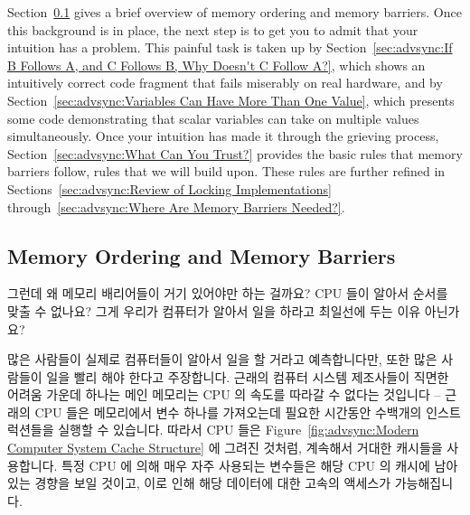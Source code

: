 Section~\ref{sec:advsync:Memory Ordering and Memory Barriers}
gives a brief overview of memory ordering and memory barriers.
Once this background is in place, the next step is to get you to admit
that your intuition has a problem.
This painful task is taken up by
Section~\ref{sec:advsync:If B Follows A, and C Follows B, Why Doesn't C Follow A?},
which shows an intuitively correct code fragment that fails miserably
on real hardware, and by
Section~\ref{sec:advsync:Variables Can Have More Than One Value},
which presents some code demonstrating that scalar variables can
take on multiple values simultaneously.
Once your intuition has made it through the grieving process,
Section~\ref{sec:advsync:What Can You Trust?}
provides the basic rules that memory barriers follow, rules that we
will build upon.
These rules are further refined in
Sections~\ref{sec:advsync:Review of Locking Implementations}
through~\ref{sec:advsync:Where Are Memory Barriers Needed?}.
\fi

\subsection{Memory Ordering and Memory Barriers}
\label{sec:advsync:Memory Ordering and Memory Barriers}

그런데 왜 메모리 배리어들이 거기 있어야만 하는 걸까요?
CPU 들이 알아서 순서를 맞출 수 없나요?
그게 우리가 컴퓨터가 알아서 일을 하라고 최일선에 두는 이유 아닌가요?

많은 사람들이 실제로 컴퓨터들이 알아서 일을 할 거라고 예측합니다만, 또한 많은
사람들이 일을 빨리 해야 한다고 주장합니다.
근래의 컴퓨터 시스템 제조사들이 직면한 어려움 가운데 하나는 메인 메모리는 CPU
의 속도를 따라갈 수 없다는 것입니다 -- 근래의 CPU 들은 메모리에서 변수 하나를
가져오는데 필요한 시간동안 수백개의 인스트럭션들을 실행할 수 있습니다.
따라서 CPU 들은 Figure~\ref{fig:advsync:Modern Computer System Cache Structure}
에 그려진 것처럼, 계속해서 거대한 캐시들을 사용합니다.
특정 CPU 에 의해 매우 자주 사용되는 변수들은 해당 CPU 의 캐시에 남아있는 경향을
보일 것이고, 이로 인해 해당 데이터에 대한 고속의 액세스가 가능해집니다.

